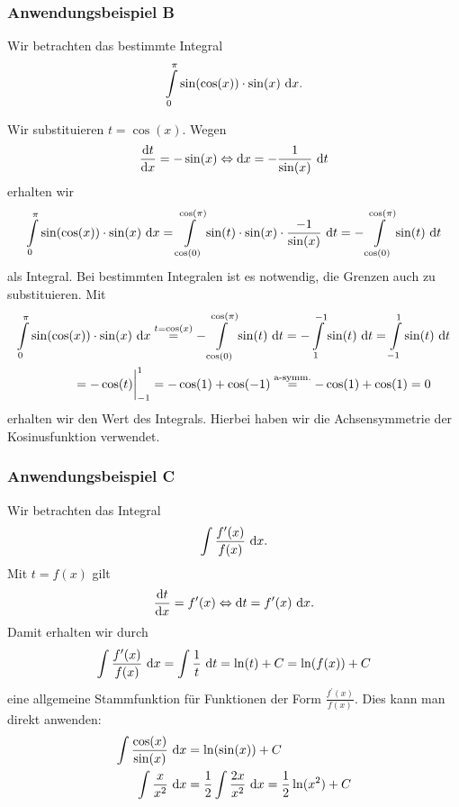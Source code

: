 \subsubsection*{Anwendungsbeispiel B}
Wir betrachten das bestimmte Integral
\begin{align*}
\int \limits_0^\pi \sin(\cos(x)) \cdot \sin(x) \ \text{\rmfamily d} x.
\end{align*}

Wir substituieren $t = \cos(x)$.
Wegen
\begin{align*}
\frac{\mathrm{d} t}{\mathrm{d} x} = - \sin(x) 
\Leftrightarrow
\mathrm{d} x = -\frac{1}{\sin(x)} \ \text{\rmfamily d} t
\end{align*}
erhalten wir 
\begin{align*}
\int \limits_0^\pi \sin(\cos(x)) \cdot \sin(x) \ \text{\rmfamily d} x
= 
\int \limits_{\cos(0)}^{\cos(\pi)} \sin(t) \cdot \sin(x) \cdot \frac{-1}{\sin(x)} \ \text{\rmfamily d} t
=
- \int \limits_{\cos(0)}^{\cos(\pi)} \sin(t)\ \text{\rmfamily d} t
\end{align*}
als Integral. Bei bestimmten Integralen ist es notwendig, die Grenzen auch zu substituieren.
Mit 
\begin{align*}
\int \limits_0^\pi \sin(\cos(x)) \cdot \sin(x) \ \text{\rmfamily d} x
&\stackrel{t = \cos(x)}{=}
- \int \limits_{\cos(0)}^{\cos(\pi)} \sin(t)\ \text{\rmfamily d} t
=
- \int \limits_{1}^{-1} \sin(t)\ \text{\rmfamily d} t
=
\int \limits_{-1}^{1} \sin(t)\ \text{\rmfamily d} t \\ 
=
- \cos(t) \bigg|_{-1}^1 &= -\cos(1) + \cos(-1)
\stackrel{\text{a-symm.}}{=} -\cos(1) + \cos(1) = 0 
\end{align*}
erhalten wir den Wert des Integrals.
Hierbei haben wir die Achsensymmetrie der Kosinusfunktion verwendet.

\subsubsection*{Anwendungsbeispiel C}
Wir betrachten das Integral
\begin{align*}
\int \frac{f^\prime(x)}{f(x)} \ \text{\rmfamily d} x.
\end{align*}
Mit $t = f(x) $ gilt
\begin{align*}
\frac{\mathrm{d} t}{\mathrm{d} x} = f^\prime(x)
\Leftrightarrow
\mathrm{d} t = f^\prime(x) \ \text{\rmfamily d} x.
\end{align*}
Damit erhalten wir durch
\begin{align*}
 \int \frac{f^\prime(x)}{f(x)} \ \text{\rmfamily d} x
 = 
 \int \frac{1}{t} \ \text{\rmfamily d} t 
 =
 \ln(t) + C 
 =
 \ln(f(x)) + C
\end{align*}
eine allgemeine Stammfunktion für Funktionen der Form $\frac{f^\prime(x) }{f(x)}$.
Dies kann man direkt anwenden:
\begin{align*}
\int \frac{\cos(x)}{\sin(x)} \ \text{\rmfamily d} x &= \ln(\sin(x)) +C \\
\int \frac{x}{ x^2} \ \text{\rmfamily d} x &= \frac{1}{2} \int \frac{2x}{ x^2} \ \text{\rmfamily d} x = \frac{1}{2} \ln(x^2) + C
\end{align*}

